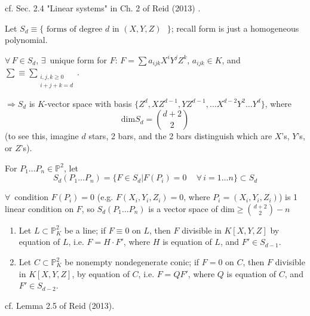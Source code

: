 cf. Sec. 2.4 "Linear systems" in Ch. 2 of Reid (2013) \cite{agat:Reid2013}.

Let $S_d \equiv \lbrace \text{ forms of degree $d$ in $(X, Y, Z)$ } \rbrace$; recall form is just a homogeneous polynomial.

$\forall \, F \in S_d$, $\exists \, $ unique form for $F$: $F = \sum a_{ijk} X^i Y^j Z^k$, $a_{ijk} \in K$, and $\sum \equiv \sum_{ \substack{ i,j,k \geq 0 \\ i + j + k = d } }$.

$\Longrightarrow S_d $ is $K$-vector space with basis $\lbrace Z^d, XZ^{d-1}, YZ^{d-1}, \dots X^{d-2} Y^2 \dots Y^d \rbrace$, where
\[
\boxed{ \text{dim}S_d  = \binom{d+2}{2} }
\]
(to see this, imagine $d$ stars, 2 bars, and the 2 bars distinguish which are $X$'s, $Y$'s, or $Z$'s). 

For $P_1 \dots P_n \in \mathbb{P}^2$, let 
\[
S_d(P_1 \dots P_n) = \lbrace F \in S_d | F(P_i) =0 \quad \, \forall \, i = 1 \dots n \rbrace \subset S_d
\]

$\forall \, $ condition $F(P_i) = 0$ (e.g. $F(X_i, Y_i, Z_i) =0$, where $P_i = (X_i, Y_i, Z_i)$) is 1 linear condition on $F$, so $S_d(P_1 \dots P_n)$ is a vector space of $\text{dim} \geq \binom{ d+2}{2} - n$

\begin{lemma}\label{agat:Lem:SpecialCaseOfNullstellensatz}
	\begin{enumerate}
		\item[(i)] Let $L \subset \mathbb{P}_K^2$ be a line; if $F \equiv 0$ on $L$, then $F$ divisible in $K[X, Y, Z]$ by equation of $L$, i.e. $F = H \cdot F'$, where $H$ is equation of $L$, and $F' \in S_{d-1}$. 
		\item[(ii)] Let $C \subset \mathbb{P}^2_K$ be nonempty nondegenerate conic; if $F =0$ on $C$, then $F$ divisible in $K[X,Y,Z]$, by equation of $C$, i.e. $F = QF'$, where $Q$ is equation of $C$, and $F' \in S_{d-2}$. 
	\end{enumerate}
\end{lemma}

cf. Lemma 2.5 of Reid (2013). 

